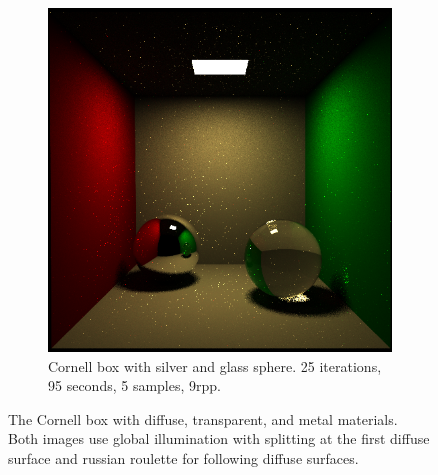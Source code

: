 \begin{figure}[h]
\begin{subfigure}[b]{0.7\textwidth}
		\includegraphics[width=\textwidth]{week5/cornellrightsphere_25_95s_5spp_9rpp.png}
		\caption{Cornell box with silver and glass sphere. 25 iterations, 95 seconds, 5 samples, 9rpp.}
		\label{fig:cornellspheresglobalillum}
	\end{subfigure}
	\caption{The Cornell box with diffuse, transparent, and metal materials. Both images use global illumination with splitting at the first diffuse surface and russian roulette for following diffuse surfaces.}
	\label{fig:globalillum}
\end{figure}

